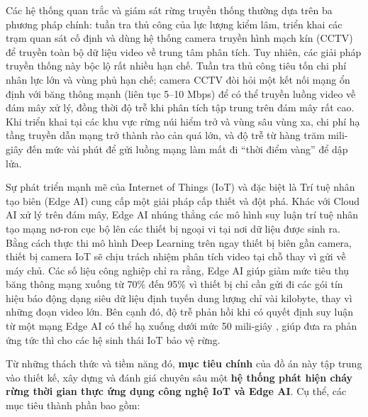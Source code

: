 \documentclass[12pt,a4paper]{report}
\begin{document}
Các hệ thống quan trắc và giám sát rừng truyền thống thường dựa trên ba phương pháp chính: tuần tra thủ công của lực lượng kiểm lâm, triển khai các trạm quan sát cố định và dùng hệ thống camera truyền hình mạch kín (CCTV) để truyền toàn bộ dữ liệu video về trung tâm phân tích. Tuy nhiên, các giải pháp truyền thống này bộc lộ rất nhiều hạn chế. Tuần tra thủ công tiêu tốn chi phí nhân lực lớn và vùng phủ hạn chế; camera CCTV đòi hỏi một kết nối mạng ổn định với băng thông mạnh (liên tục 5--10 Mbps) để có thể truyền luồng video về đám mây xử lý, đồng thời độ trễ khi phân tích tập trung trên đám mây rất cao. Khi triển khai tại các khu vực rừng núi hiểm trở và vùng sâu vùng xa, chi phí hạ tầng truyền dẫn mạng trở thành rào cản quá lớn, và độ trễ từ hàng trăm mili-giây đến mức vài phút để gửi luồng mạng làm mất đi ``thời điểm vàng'' để dập lửa.

Sự phát triển mạnh mẽ của Internet of Things (IoT) và đặc biệt là Trí tuệ nhân tạo biên (Edge AI) cung cấp một giải pháp cấp thiết và đột phá. Khác với Cloud AI xử lý trên đám mây, Edge AI nhúng thẳng các mô hình suy luận trí tuệ nhân tạo mạng nơ-ron cục bộ lên các thiết bị ngoại vi tại nơi dữ liệu được sinh ra. Bằng cách thực thi mô hình Deep Learning trên ngay thiết bị biên gần camera, thiết bị camera IoT sẽ chịu trách nhiệm phân tích video tại chỗ thay vì gửi về máy chủ. Các số liệu công nghiệp chỉ ra rằng, Edge AI giúp giảm mức tiêu thụ băng thông mạng xuống từ 70\% đến 95\% \cite{edgeai_bandwidth} vì thiết bị chỉ cần gửi đi các gói tín hiệu báo động dạng siêu dữ liệu định tuyến dung lượng chỉ vài kilobyte, thay vì những đoạn video lớn. Bên cạnh đó, độ trễ phản hồi khi có quyết định suy luận từ một mạng Edge AI có thể hạ xuống dưới mức 50 mili-giây \cite{edgeai_latency}, giúp đưa ra phản ứng tức thì cho các hệ sinh thái IoT bảo vệ rừng.

Từ những thách thức và tiềm năng đó, \textbf{mục tiêu chính} của đồ án này tập trung vào thiết kế, xây dựng và đánh giá chuyên sâu một \textbf{hệ thống phát hiện cháy rừng thời gian thực ứng dụng công nghệ IoT và Edge AI}. Cụ thể, các mục tiêu thành phần bao gồm:
\end{document}
